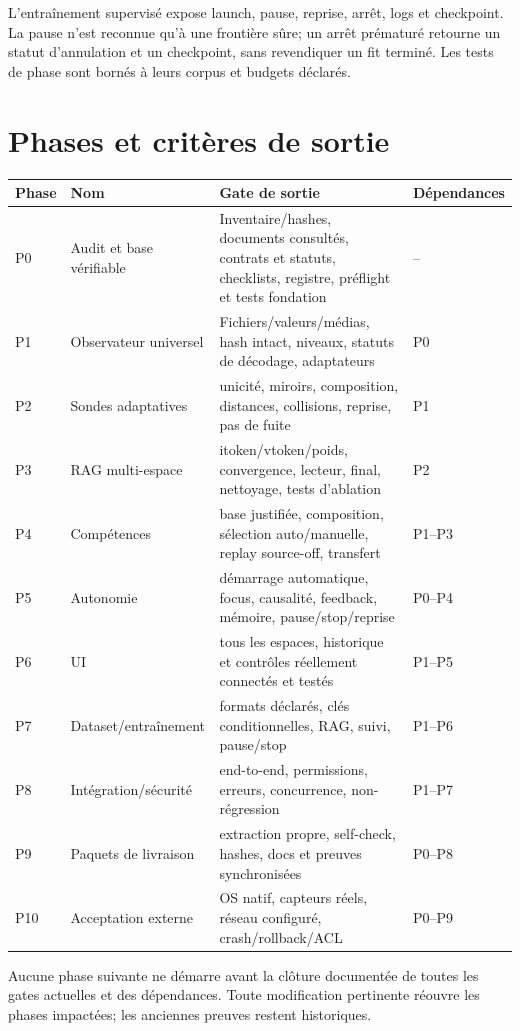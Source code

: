 \documentclass[11pt,a4paper]{report}
\begin{document}
L'entraînement supervisé expose launch, pause, reprise, arrêt, logs et checkpoint. La pause n'est reconnue qu'à une frontière sûre; un arrêt prématuré retourne un statut d'annulation et un checkpoint, sans revendiquer un fit terminé. Les tests de phase sont bornés à leurs corpus et budgets déclarés.

\chapter{Phases et critères de sortie}
\small
\begin{longtable}{>{\raggedright\arraybackslash}p{.07\linewidth}>{\raggedright\arraybackslash}p{.20\linewidth}>{\raggedright\arraybackslash}p{.50\linewidth}>{\raggedright\arraybackslash}p{.12\linewidth}}\toprule Phase & Nom & Gate de sortie & Dépendances \\
\midrule P0 & Audit et base vérifiable & Inventaire/hashes, documents consultés, contrats et statuts, checklists, registre, préflight et tests fondation & -- \\
P1 & Observateur universel & Fichiers/valeurs/médias, hash intact, niveaux, statuts de décodage, adaptateurs & P0 \\
P2 & Sondes adaptatives & unicité, miroirs, composition, distances, collisions, reprise, pas de fuite & P1 \\
P3 & RAG multi-espace & itoken/vtoken/poids, convergence, lecteur, final, nettoyage, tests d'ablation & P2 \\
P4 & Compétences & base justifiée, composition, sélection auto/manuelle, replay source-off, transfert & P1--P3 \\
P5 & Autonomie & démarrage automatique, focus, causalité, feedback, mémoire, pause/stop/reprise & P0--P4 \\
P6 & UI & tous les espaces, historique et contrôles réellement connectés et testés & P1--P5 \\
P7 & Dataset/entraînement & formats déclarés, clés conditionnelles, RAG, suivi, pause/stop & P1--P6 \\
P8 & Intégration/sécurité & end-to-end, permissions, erreurs, concurrence, non-régression & P1--P7 \\
P9 & Paquets de livraison & extraction propre, self-check, hashes, docs et preuves synchronisées & P0--P8 \\
P10 & Acceptation externe & OS natif, capteurs réels, réseau configuré, crash/rollback/ACL & P0--P9 \\
\bottomrule\end{longtable}\normalsize
Aucune phase suivante ne démarre avant la clôture documentée de toutes les gates actuelles et des dépendances. Toute modification pertinente réouvre les phases impactées; les anciennes preuves restent historiques.
\end{document}
